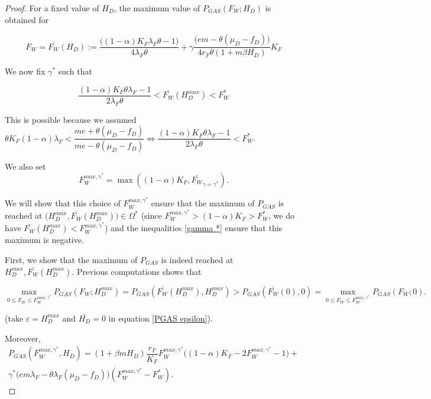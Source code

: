 \documentclass{article}
\newcommand{\lfw}{\lambda_{F}}
\newcommand{\lfw}{\lambda_{F}}
\renewcommand{\epsilon}{\varepsilon}
\begin{document}
\begin{proof}
\medskip

For a fixed value of $H_D$, the maximum value of $P_{GAS}(F_W ; H_D)$ is obtained for 

$$F_W = \bar{F_W}(H_D) := \dfrac{ \big((1-\alpha)K_F \lfw \theta - 1\big)}{4 \lfw \theta} + \gamma \dfrac{\Big(em - \theta (\mu_D - f_D)\Big)}{4 r_F \theta (1 + m \beta H_D)} K_F $$

We now fix $\gamma^*$ such that

\begin{equation}\label{gamma *}
\dfrac{(1-\alpha) K_F \theta \lfw -1}{2 \lfw \theta} < \bar{F_W}(H_D^{max}) < F_W^*
\end{equation}

This is possible because we assumed $\theta K_{F}(1-\alpha)\lambda_{F}<\dfrac{me+\theta(\mu_{D}-f_{D})}{me-\theta(\mu_{D}-f_{D})} \Leftrightarrow \dfrac{(1-\alpha) K_F \theta \lfw -1}{2 \lfw \theta} < F_W^*$. 

We also set 
\begin{equation} \label{FWmax}
F_W^{max, \gamma^*} = \max((1-\alpha)K_F, \bar{F_W}_{\gamma = \gamma^*}).
\end{equation}

We will show that this choice of $F_W^{max, \gamma^*}$ ensure that the maximum of $P_{GAS}$ is reached at $\Big(H_D^{max}, \bar{F_W}(H_D^{max})\Big) \in \Omega^*$ (since $F_W^{max, \gamma^*} > (1-\alpha) K_F > F^*_W$, we do have $\bar{F_W}(H_D^{max}) < F_W^{max, \gamma^*}$) and the inequalities \eqref{gamma *} ensure that this maximum is negative.

First, we show that the maximum of $P_{GAS}$ is indeed reached at $H_D^{max}, \bar{F_W}(H_D^{max})$. Previous computations shows that 

\begin{equation} \label{max1}
\max_{0 \leq F_W \leq F_W^{max, \gamma^*}} P_{GAS}(F_W ; H_D^{max}) = P_{GAS}(\bar{F_W}(H_D^{max}), H_D^{max}) > P_{GAS}(\bar{F_W}(0), 0) = \max_{0 \leq F_W \leq F_W^{max, \gamma^*}} P_{GAS}(F_W ; 0).
\end{equation}

(take $\epsilon = H_D^{max}$ and $\bar{H_D} = 0$ in equation \eqref{PGAS epsilon}).

Moreover,
\begin{multline*}
P_{GAS}(F_W^{max, \gamma^*}, H_D) = (1+ \beta m H_D) \dfrac{r_F}{K_F}F_W^{max, \gamma^*} \Big((1-\alpha)K_F - 2F_W^{max, \gamma^*} - 1\Big) +  \\
\gamma^* \Big(e m \lfw - \theta \lfw(\mu_D - f_D) \Big)( F_W^{max, \gamma^*} - F_W^*).
\end{multline*}


\end{proof}
\end{document}
